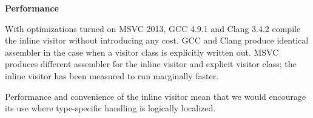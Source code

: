\documentclass[10pt,a4paper]{article}
\renewcommand\section[1]{
    \begin{minipage}[c]{0.94\linewidth}
    \large \raggedright \sffamily \textbf{#1}
    \end{minipage}
}
\begin{document}
\section{Performance}

With optimizations turned on MSVC 2013, GCC 4.9.1 and Clang 3.4.2 compile the
inline visitor without introducing any cost. GCC and Clang produce identical
assembler in the case when a visitor class is explicitly written out. MSVC
produces different assembler for the inline visitor and explicit visitor class;
the inline visitor has been measured to run marginally faster.

Performance and convenience of the inline visitor mean that we would encourage
its use where type-specific handling is logically localized.
\end{document}
